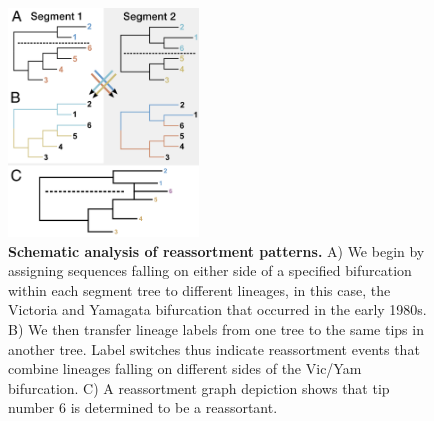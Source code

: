 \documentclass[11pt,oneside,letterpaper]{article}
\begin{document}
\begin{figure}[h]
 \centering		
	\includegraphics[width=0.45\textwidth]{figures/TreeFigure2}
	\caption{\textbf{Schematic analysis of reassortment patterns.}
	A) We begin by assigning sequences falling on either side of a specified bifurcation within each segment tree to different lineages, in this case, the Victoria and Yamagata bifurcation that occurred in the early 1980s.
	B) We then transfer lineage labels from one tree to the same tips in another tree.
	Label switches thus indicate reassortment events that combine lineages falling on different sides of the Vic/Yam bifurcation.
	C) A reassortment graph depiction shows that tip number 6 is determined to be a reassortant.
	}
	\label{methodFig}
\end{figure}
\end{document}
